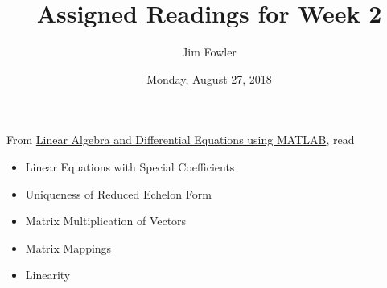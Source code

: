 \documentclass{homework}
\author{Jim Fowler}
\title{Assigned Readings for Week 2}
\date{Monday, August 27, 2018}
\begin{document}
\maketitle

From \href{/courses/43735/files/folder/textbooks}{Linear Algebra and Differential Equations using MATLAB}, read 
\begin{itemize}
\item {} Linear Equations with Special Coefficients
\item {} Uniqueness of Reduced Echelon Form
\item {} Matrix Multiplication of Vectors
\item {} Matrix Mappings
\item {} Linearity
\end{itemize}
\end{document}

